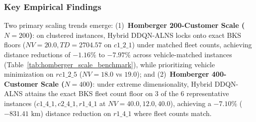 \documentclass{ieeeaccess}
\begin{document}
\subsubsection{Key Empirical Findings}
Two primary scaling trends emerge: (1)~\textbf{Homberger 200-Customer Scale ($N=200$)}: on clustered instances, Hybrid DDQN-ALNS locks onto exact BKS floors ($NV=20.0, TD=2704.57$ on $c1\_2\_1$) under matched fleet counts, achieving distance reductions of $-1.16\%$ to $-7.97\%$ across vehicle-matched instances (Table~\ref{tab:homberger_scale_benchmark}), while prioritizing vehicle minimization on $rc1\_2\_5$ ($NV=18.0$ vs $19.0$); and (2)~\textbf{Homberger 400-Customer Scale ($N=400$)}: under extreme dimensionality, Hybrid DDQN-ALNS attains the exact BKS fleet count floor on 3 of the 6 representative instances ($c1\_4\_1, c2\_4\_1, r1\_4\_1$ at $NV=40.0, 12.0, 40.0$), achieving a $-7.10\%$ ($-831.41\text{ km}$) distance reduction on $r1\_4\_1$ where fleet counts match.
\end{document}
